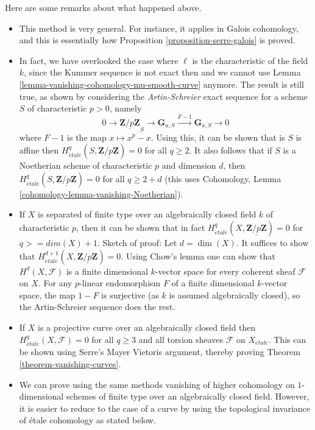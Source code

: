 \begin{remarks}
\label{remarks-on-above}
Here are some remarks about what happened above.
\begin{itemize}
\item This method is very general. For instance, it applies in Galois
cohomology, and this is essentially how
Proposition \ref{proposition-serre-galois} is proved.
\item In fact, we have overlooked the case where $\ell$ is the characteristic
of the field $k$, since the Kummer sequence is not exact then and we cannot
use Lemma \ref{lemma-vanishing-cohomology-mu-smooth-curve} anymore.
The result is still true, as shown by considering the
{\it Artin-Schreier} exact sequence for a scheme $S$ of characteristic
$p >0$, namely
$$
0 \longrightarrow \underline{\mathbf{Z}/p\mathbf{Z}}_S \longrightarrow
\mathbf{G}_{a, S} \xrightarrow{F-1} \mathbf{G}_{a, S} \longrightarrow 0
$$
where $F - 1$ is the map $x \mapsto x^p - x$. Using this, it can be
shown that is $S$ is affine then
$H_{\acute{e}tale}^q(S, \underline{\mathbf{Z}/p\mathbf{Z}}) = 0$ for all
$q \geq 2$. It also follows that if $S$ is a Noetherian scheme of
characteristic $p$ and dimension $d$, then
$H_{\acute{e}tale}^q(S, \underline{\mathbf{Z}/p\mathbf{Z}}) = 0$
for all $q \geq 2 + d$
(this uses Cohomology, Lemma \ref{cohomology-lemma-vanishing-Noetherian}).
\item If $X$ is separated of finite type over an algebraically closed
field $k$ of characteristic $p$, then it can be shown that in fact
$H_{\acute{e}tale}^q(X, \underline{\mathbf{Z}/p\mathbf{Z}}) = 0$ for
$q >= dim(X) + 1$.
Sketch of proof: Let $d = \dim(X)$. It suffices to show that
$H_{\acute{e}tale}^{d + 1}(X, \underline{\mathbf{Z}/p\mathbf{Z}}) = 0$.
Using Chow's lemma one can show that $H^d(X, \mathcal{F})$
is a finite dimensional $k$-vector space for every coherent sheaf
$\mathcal{F}$ on $X$. For any $p$-linear endomorphism $F$ of
a finite dimensional $k$-vector space, the map $1 - F$ is surjective (as
$k$ is assumed algebraically closed),
so the Artin-Schreier sequence does the rest.
\item If $X$ is a projective curve over an algebraically closed field then
$H_{\acute{e}tale}^q(X, \mathcal{F}) = 0$ for all $q \geq 3$ and all torsion
sheaves $\mathcal{F}$ on $X_{\acute{e}tale}$. This can be shown using
Serre's Mayer Vietoris
argument, thereby proving Theorem \ref{theorem-vanishing-curves}.
\item We can prove using the same methods vanishing of higher cohomology
on $1$-dimensional schemes of finite type over an algebraically closed field.
However, it is easier to reduce to the case of a curve by using the
topological invariance of \'etale cohomology as stated below.
\end{itemize}
\end{remarks}

